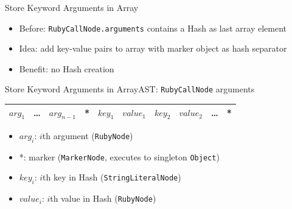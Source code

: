 \documentclass[xcolor=dvipsname,handout]{beamer} %
\begin{document}


\begin{frame}{Store Keyword Arguments in Array}
\begin{itemize}
    \item Before: \lstinline{RubyCallNode.arguments} contains a Hash as last array element
    \item Idea: add key-value pairs to array with marker object as hash separator
    \item Benefit: no Hash creation
\end{itemize}
\end{frame}

\begin{frame}{Store Keyword Arguments in Array}{AST: \lstinline{RubyCallNode} arguments}
\begin{table}
\begin{tabular}{|c|c|c|c|c|c|c|c|c|c|}
\hline
$\mathit{arg}_1$ & \ldots & $\mathit{arg}_{n-1}$ & * & $\mathit{key}_1$ & $\mathit{value}_1$ & $\mathit{key}_2$ & $\mathit{value}_2$ & \ldots & * \\
\hline
\end{tabular}
\end{table}
\begin{itemize}
    \item $\mathit{arg}_i$: $i$th argument (\lstinline{RubyNode})
    \item *: marker (\lstinline{MarkerNode}, executes to singleton \lstinline{Object})
    \item $\mathit{key}_i$: $i$th key in Hash (\lstinline{StringLiteralNode})
    \item $\mathit{value}_i$: $i$th value in Hash (\lstinline{RubyNode})
\end{itemize}
\end{frame}

\end{document}
